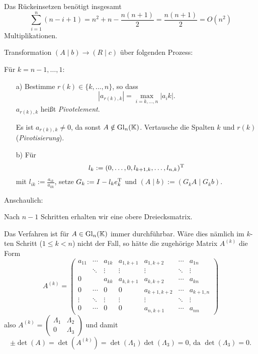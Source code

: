 Das Rückeinsetzen benötigt insgesamt \[
  \sum_{i=1}^n (n - i + 1) = n^2 + n - \frac{n(n+1)}{2} = \frac{n(n+1)}{2}
    = O(n^2)
\] Multiplikationen.

Transformation $(A \mid b) \to (R \mid c)$ über folgenden Prozess:

Für $k=n-1, \ldots, 1$:
\begin{itemize}
  \item[a)] Bestimme $r(k) \in \{k, \ldots, n\}$, so dass
    $$|a_{r(k),k}| = \max_{i=k,\ldots,n}|a_ik|.$$
    $a_{r(k),k}$ heißt \emph{Pivotelement}.

    Es ist $a_{r(k),k} \ne 0$, da sonst $A \notin \mathrm{Gl}_n(\mathbb K)$.
    Vertausche die Spalten $k$ und $r(k)$ (\emph{Pivotisierung}).

    \item[b)] Für $$l_k := (0, \ldots, 0, l_{k+1,k}, \ldots, l_{n,k})^\mathrm T$$
    mit $l_{ik} := \frac{a_{ik}}{a_{kk}}$, setze $G_k := I - l_ke_k^\mathrm T$
    und $(A \mid b) := (G_k A \mid G_k b)$.
\end{itemize}

Anschaulich: %

Nach $n-1$ Schritten erhalten wir eine obere Dreiecksmatrix.

\begin{Bemerkung}
Das Verfahren ist für $A \in \mathrm{Gl}_n(\mathbb K)$ immer durchführbar.
Wäre dies nämlich im $k$-ten Schritt ($1 \le k < n$) nicht der Fall, so
hätte die zugehörige Matrix $A^{(k)}$ die Form \[
  A^{(k)} = \left( \begin{array}{ccc|cccc}
  a_{11} & \cdots & a_{1k} & a_{1,k+1} & a_{1,k+2} & \cdots & a_{1n} \\
  & \ddots & \vdots & \vdots & \vdots & \ddots & \vdots \\
  0 & & a_{kk} & a_{k,k+1} & a_{k,k+2} & \cdots & a_{kn} \\ \hline
  0 & \cdots & 0 & 0 & a_{k+1,k+2} & \cdots & a_{k+1,n} \\
  \vdots & \ddots & \vdots & \vdots & \vdots & \ddots &  \vdots \\
  0 & \cdots & 0 & 0 & a_{n,k+1} & \cdots & a_{nn}
  \end{array} \right)
\] also \(
  A^{(k)} = \left( \begin{array}{c|c} \Lambda_1 & \Lambda_2 \\\hline 0 & \Lambda_3 \end{array} \right)
\) und damit
$$\pm \det(A) = \det(A^{(k)}) = \det(\Lambda_1) \det(\Lambda_3) = 0\text{, da }\det (\Lambda_3) = 0.$$
\end{Bemerkung}

